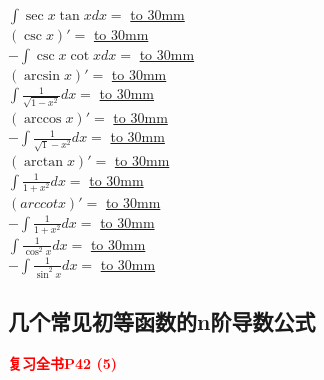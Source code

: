 \documentclass[a4paper]{ctexart}
\begin{document}
\begin{multicols}{2}
    $\int{\sec{x}\tan{x}dx}=$       
    \underline{\hbox to 30mm{}} \\
    $(\csc{x})'=$                   
    \underline{\hbox to 30mm{}} \\
    $-\int{\csc{x}\cot{x}dx}=$      
    \underline{\hbox to 30mm{}} \\
    $(\arcsin{x})'=$                
    \underline{\hbox to 30mm{}} \\
    $\int{\frac{1}{\sqrt{1-x^2}}dx}=$
    \underline{\hbox to 30mm{}} \\
    $(\arccos{x})'=$                
    \underline{\hbox to 30mm{}} \\
    $-\int{\frac{1}{\sqrt1-x^2}dx}=$
    \underline{\hbox to 30mm{}} \\
    $(\arctan{x})'=$                
    \underline{\hbox to 30mm{}} \\
    $\int{\frac{1}{1+x^2}dx}=$      
    \underline{\hbox to 30mm{}} \\
    $(arccotx)'=$                
    \underline{\hbox to 30mm{}} \\
    $-\int{\frac{1}{1+x^2}dx}=$     
    \underline{\hbox to 30mm{}} \\
    $\int{\frac{1}{\cos^2{x}}dx}=$  
    \underline{\hbox to 30mm{}} \\
    $-\int{\frac{1}{\sin^2{x}}dx}=$ 
    \underline{\hbox to 30mm{}} \\

\end{multicols}

\subsection{几个常见初等函数的n阶导数公式}
    \textcolor{red}{\textbf{复习全书P42 \quad (5)}}
\end{document}
